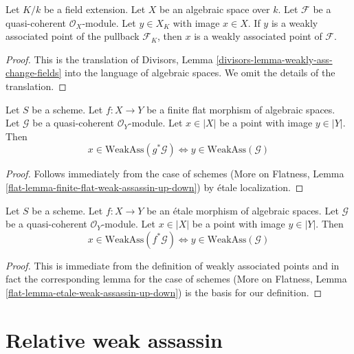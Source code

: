 \begin{lemma}
\label{lemma-weakly-ass-change-fields}
Let $K/k$ be a field extension. Let $X$ be an algebraic space over $k$.
Let $\mathcal{F}$ be a quasi-coherent $\mathcal{O}_X$-module.
Let $y \in X_K$ with image $x \in X$. If $y$ is a weakly
associated point of the pullback $\mathcal{F}_K$, then $x$
is a weakly associated point of $\mathcal{F}$.
\end{lemma}

\begin{proof}
This is the translation of
Divisors, Lemma \ref{divisors-lemma-weakly-ass-change-fields}
into the language of algebraic spaces. We omit the details of the
translation.
\end{proof}

\begin{lemma}
\label{lemma-finite-flat-weak-assassin-up-down}
Let $S$ be a scheme.
Let $f : X \to Y$ be a finite flat morphism of algebraic spaces.
Let $\mathcal{G}$ be a quasi-coherent $\mathcal{O}_Y$-module.
Let $x \in |X|$ be a point with image $y \in |Y|$. Then
$$
x \in \text{WeakAss}(g^*\mathcal{G})
\Leftrightarrow
y \in \text{WeakAss}(\mathcal{G})
$$
\end{lemma}

\begin{proof}
Follows immediately from the case of schemes
(More on Flatness, Lemma \ref{flat-lemma-finite-flat-weak-assassin-up-down})
by \'etale localization.
\end{proof}

\begin{lemma}
\label{lemma-etale-weak-assassin-up-down}
Let $S$ be a scheme.
Let $f : X \to Y$ be an \'etale morphism of algebraic spaces.
Let $\mathcal{G}$ be a quasi-coherent $\mathcal{O}_Y$-module.
Let $x \in |X|$ be a point with image $y \in |Y|$. Then
$$
x \in \text{WeakAss}(f^*\mathcal{G})
\Leftrightarrow
y \in \text{WeakAss}(\mathcal{G})
$$
\end{lemma}

\begin{proof}
This is immediate from the definition of weakly associated points
and in fact the corresponding lemma for the case of schemes
(More on Flatness, Lemma \ref{flat-lemma-etale-weak-assassin-up-down})
is the basis for our definition.
\end{proof}







\section{Relative weak assassin}
\label{section-relative-weak-assassin}

